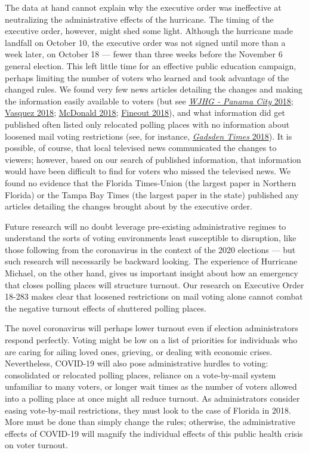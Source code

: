 \documentclass[
  12pt,
]{article}
\begin{document}
The data at hand cannot explain why the executive order was ineffective at neutralizing the administrative effects of the hurricane. The timing of the executive order, however, might shed some light. Although the hurricane made landfall on October 10, the executive order was not signed until more than a week later, on October 18 --- fewer than three weeks before the November 6 general election. This left little time for an effective public education campaign, perhaps limiting the number of voters who learned and took advantage of the changed rules. We found very few news articles detailing the changes and making the information easily available to voters (but see \protect\hyperlink{ref-WJHG2018}{\emph{WJHG - Panama City} 2018}; \protect\hyperlink{ref-Vasquez2018}{Vasquez 2018}; \protect\hyperlink{ref-McDonald2018}{McDonald 2018}; \protect\hyperlink{ref-Fineout2018}{Fineout 2018}), and what information did get published often listed only relocated polling places with no information about loosened mail voting restrictions (see, for instance, \protect\hyperlink{ref-gadsdentimes2018}{\emph{Gadsden Times} 2018}). It is possible, of course, that local televised news communicated the changes to viewers; however, based on our search of published information, that information would have been difficult to find for voters who missed the televised news. We found no evidence that the Florida Times-Union (the largest paper in Northern Florida) or the Tampa Bay Times (the largest paper in the state) published any articles detailing the changes brought about by the executive order.

Future research will no doubt leverage pre-existing administrative regimes to understand the sorts of voting environments least susceptible to disruption, like those following from the coronavirus in the context of the 2020 elections --- but such research will necessarily be backward looking. The experience of Hurricane Michael, on the other hand, gives us important insight about how an emergency that closes polling places will structure turnout. Our research on Executive Order 18-283 makes clear that loosened restrictions on mail voting alone cannot combat the negative turnout effects of shuttered polling places.

The novel coronavirus will perhaps lower turnout even if election administrators respond perfectly. Voting might be low on a list of priorities for individuals who are caring for ailing loved ones, grieving, or dealing with economic crises. Nevertheless, COVID-19 will also pose administrative hurdles to voting: consolidated or relocated polling places, reliance on a vote-by-mail system unfamiliar to many voters, or longer wait times as the number of voters allowed into a polling place at once might all reduce turnout. As administrators consider easing vote-by-mail restrictions, they must look to the case of Florida in 2018. More must be done than simply change the rules; otherwise, the administrative effects of COVID-19 will magnify the individual effects of this public health crisis on voter turnout.
\end{document}
